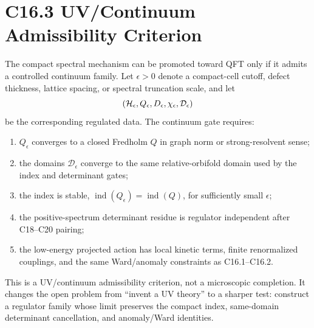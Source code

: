 \documentclass[11pt]{article}
\begin{document}
\section{C16.3 UV/Continuum Admissibility Criterion}
The compact spectral mechanism can be promoted toward QFT only if it admits a
controlled continuum family.  Let $\epsilon>0$ denote a compact-cell cutoff,
defect thickness, lattice spacing, or spectral truncation scale, and let
\[
({\cal H}_\epsilon,Q_\epsilon,D_\epsilon,\chi_\epsilon,\mathcal D_\epsilon)
\]
be the corresponding regulated data.  The continuum gate requires:
\begin{enumerate}
\item $Q_\epsilon$ converges to a closed Fredholm $Q$ in graph norm or
strong-resolvent sense;
\item the domains $\mathcal D_\epsilon$ converge to the same relative-orbifold
domain used by the index and determinant gates;
\item the index is stable, $\operatorname{ind}(Q_\epsilon)=\operatorname{ind}(Q)$,
for sufficiently small $\epsilon$;
\item the positive-spectrum determinant residue is regulator independent after
C18--C20 pairing;
\item the low-energy projected action has local kinetic terms, finite
renormalized couplings, and the same Ward/anomaly constraints as C16.1--C16.2.
\end{enumerate}
This is a UV/continuum admissibility criterion, not a microscopic completion.
It changes the open problem from ``invent a UV theory'' to a sharper test:
construct a regulator family whose limit preserves the compact index,
same-domain determinant cancellation, and anomaly/Ward identities.
\end{document}
